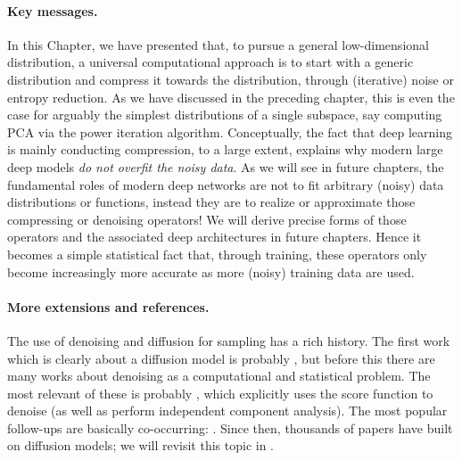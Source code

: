 \documentclass[../../book-main.tex]{subfiles}
\begin{document}
\paragraph{Key messages.}
In this Chapter, we have presented that, to pursue a general low-dimensional distribution, a universal computational approach is to start with a generic distribution and compress it towards the distribution, through (iterative) noise or entropy reduction. As we have discussed in the preceding chapter, this is even the case for arguably the simplest distributions of a single subspace, say computing PCA via the power iteration algorithm. Conceptually, the fact that deep learning is mainly conducting compression, to a large extent, explains why modern large deep models {\em do not overfit the noisy data}. As we will see in future chapters, the fundamental roles of modern deep networks are not to fit arbitrary (noisy) data distributions or functions, instead they are to realize or approximate those compressing or denoising operators! We will derive precise forms of those operators and the associated deep architectures in future chapters. Hence it becomes a simple statistical fact that, through training, these operators only become increasingly more accurate as more (noisy) training data are used. 

\paragraph{More extensions and references.}
The use of denoising and diffusion for sampling has a rich history. The first work which is clearly about a diffusion model is probably \cite{Sohl-Dickstein2015}, but before this there are many works about denoising as a computational and statistical problem. The most relevant of these is probably \cite{hyvarinen05a}, which explicitly uses the score function to denoise (as well as perform independent component analysis). The most popular follow-ups are basically co-occurring: \cite{ho2020denoising,song2019}. Since then, thousands of papers have built on diffusion models; we will revisit this topic in .
\end{document}
